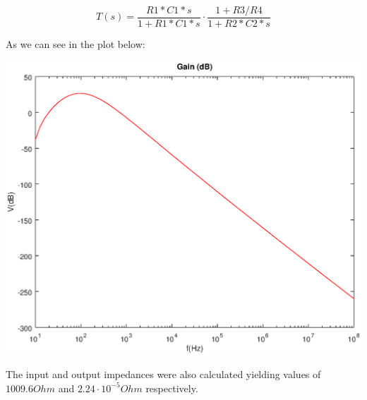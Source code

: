 \begin{equation}
    T(s)=\frac{R1*C1*s}{1+R1*C1*s}\cdot \frac{1+R3/R4}{1+R2*C2*s}
\end{equation}

As we can see in the plot below:

\includegraphics[width=0.8\linewidth]{teodB.eps}

The input and output impedances were also calculated yielding values of $1009.6 Ohm$ and $2.24\cdot 10^{-5} Ohm$ respectively.